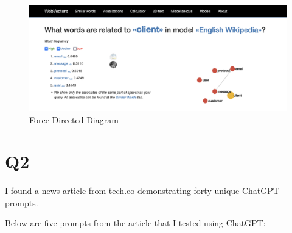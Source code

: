 \documentclass[12pt]{article}
\begin{document}
\begin{enumerate}
\begin{figure}
        \label{fig:semantic-associates-client}
    \end{figure}
    \begin{figure}
        \centering
        \includegraphics[width=0.5\linewidth]{Q1-3-3.png}
        \caption{Force-Directed Diagram}
        \label{fig:force-directed-diagram}
    \end{figure}
    
\end{enumerate}


\section*{Q2}

I found a news article from tech.co demonstrating forty unique ChatGPT prompts. 

Below are five prompts from the article that I tested using ChatGPT:
\end{document}
